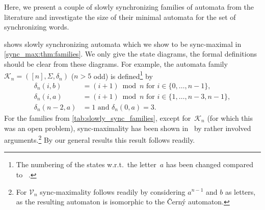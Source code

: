 Here, we present a couple of slowly synchronizing families of automata from the literature and investigate 
the size of their minimal automata for the set of synchronizing words. 

 shows slowly synchronizing automata
which we show to be sync-maximal in \cref{sync_max:thm:families}.
We only give the state diagrams, the formal definitions should be clear from these diagrams.
For example, the automata family~$\mathcal  K_n = ([n], \Sigma, \delta_n)$
($n > 5$ odd) is defined\footnote{The numbering of the states w.r.t.~the letter~$a$	has been changed compared to ~\cite{DBLP:journals/ijfcs/Maslennikova19}.}
by
\begin{align*} 
	\delta_n(i, b) & = (i + 1) \bmod{n} \mbox{ for } i \in \{0,\ldots,n-1\}, \\
	\delta_n(i, a) & = (i + 1) \bmod{n} \mbox{ for } i \in \{1, \ldots,n-3,n-1\}, \\
	\delta_n(n-2,a) & = 1 \text{ and } 	\delta_n(0,a) = 3.
\end{align*}
For the families from \cref{tab:slowly_sync_families},  except for~$\mathcal K_n$ (for which
this was an open problem), sync-maximality has been shown
in~\cite{DBLP:journals/ijfcs/Maslennikova19} by rather involved arguments.\footnote{For $\mathcal V_n$
	sync-maximality follows readily by considering $a^{n-1}$ and $b$ as letters, as the resulting
	automaton is isomorphic to the \v{C}ern\'y automaton.}
By our general results this result follows readily. 



